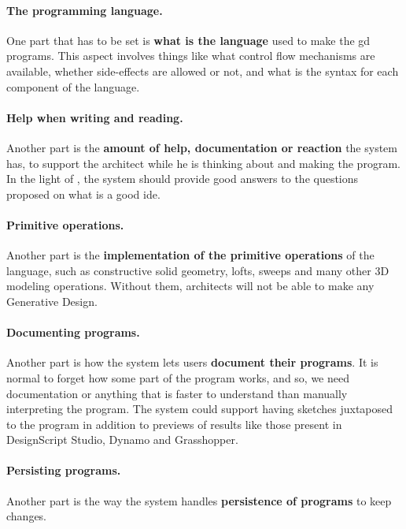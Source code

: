 \documentclass{./llncs2e/llncs}
\begin{document}
	\paragraph{The programming language.}
	One part that has to be set is \textbf{what is the language} used to make the \ac{gd} programs.
	This aspect involves things like what control flow mechanisms are available, whether side-effects are allowed or not, and what is the syntax for each component of the language.

	\paragraph{Help when writing and reading.}
	Another part is the \textbf{amount of help, documentation or reaction} the system has, to support the architect while he is thinking about and making the program.
	In the light of \cite{victor2012learnable}, the system should provide good answers to the questions proposed on what is a good \ac{ide}.

	\paragraph{Primitive operations.}
	Another part is the \textbf{implementation of the primitive operations} of the language, such as constructive solid geometry, lofts, sweeps and many other 3D modeling operations.
	Without them, architects will not be able to make any Generative Design.

	\paragraph{Documenting programs.}
	Another part is how the system lets users \textbf{document their programs}. 
	It is normal to forget how some part of the program works, and so, we need documentation or anything that is faster to understand than manually interpreting the program.
	The system could support having sketches juxtaposed to the program in addition to previews of results like those present in DesignScript Studio, Dynamo and Grasshopper. 

	\paragraph{Persisting programs.}
	Another part is the way the system handles \textbf{persistence of programs} to keep changes.
	
\end{document}
